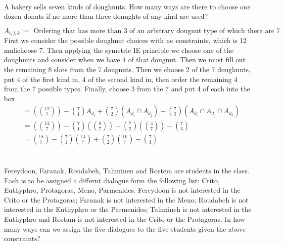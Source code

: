 \documentclass[12pt,letterpaper,boxed]{hmcpset}
\begin{document}
\begin{problem}[Shahriari 8.2.3][20]\\
A bakery sells seven kinds of doughnuts. How many ways are there to choose one dozen donuts if no more than three donughts of any kind are used?
\end{problem}

\begin{solution}
$$A_{i,j,k}:=\text{ Ordering that has more than 3 of an arbitrary dougnut type of which there are 7}$$
First we consider the possible doughnut choices with no constraints, which is 12 mulichoose 7. Then applying the symetric IE principle we choose one of the doughnuts and consider when we have 4 of that dougnut. Then we must fill out the remaining 8 slots from the 7 dougnuts. Then we choose 2 of the 7 doughnuts, put 4 of the first kind in, 4 of the second kind in, then order the remaining 4 from the 7 possible types. Finally, choose 3 from the 7 and put 4 of each into the box.
\begin{align*}
&=(\binom{12}{7}) - \binom{7}{1} A_{d_i} + \binom{7}{2} (A_{d_i} \cap A_{d_j}) - \binom{7}{3} (A_{d_i} \cap A_{d_j} \cap A_{d_k})\\
&=(\binom{12}{7}) - \binom{7}{1} (\binom{8}{7}) + \binom{7}{2} (\binom{4}{7}) - \binom{7}{3} \\
&=\boxed{\binom{18}{7} - \binom{7}{1} \binom{14}{7} + \binom{7}{2} \binom{10}{7} - \binom{7}{3}} \\
\end{align*}
\end{solution}


\begin{problem}[Shahriari 8.3.10][20]\\
Fereydoon, Faranak, Roudabeh, Tahminen and Rostem are students in the class. Each is to be assigned a differnt dialogue form the following list: Crito, Euthyphro, Protagoras, Meno, Parmenides. Fereydoon is not interested in the Crito or the Protagoras; Faranak is not interested in the Meno; Roudabeh is not interested in the Euthyphro or the Parmenides; Tahmineh is not interested in the Euthyphro and Rostam is not interested in the Crito or the Protagoras. In how many ways can we assign the five dialogues to the five students given the above constraints?
\end{problem}
\end{document}
